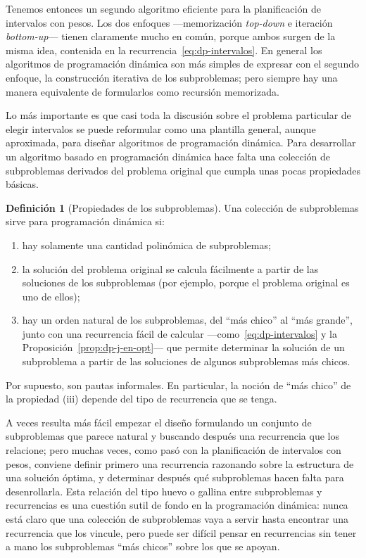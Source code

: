 \documentclass[12pt, spanish, oneside, openany]{book}
\theoremstyle{uprightplain}
\theoremstyle{definition}
\newtheorem{definicion}[teorema]{Definición}
\theoremstyle{remark}
\theoremstyle{definition}
\begin{document}
Tenemos entonces un segundo algoritmo eficiente para la planificación de intervalos con pesos. Los dos enfoques ---memorización \emph{top-down} e iteración \emph{bottom-up}--- tienen claramente mucho en común, porque ambos surgen de la misma idea, contenida en la recurrencia~\eqref{eq:dp-intervalos}. En general los algoritmos de programación dinámica son más simples de expresar con el segundo enfoque, la construcción iterativa de los subproblemas; pero siempre hay una manera equivalente de formularlos como recursión memorizada.

Lo más importante es que casi toda la discusión sobre el problema particular de elegir intervalos se puede reformular como una plantilla general, aunque aproximada, para diseñar algoritmos de programación dinámica. Para desarrollar un algoritmo basado en programación dinámica hace falta una colección de subproblemas derivados del problema original que cumpla unas pocas propiedades básicas.

\begin{definicion}[Propiedades de los subproblemas]
\label{def:dp-propiedades}
Una colección de subproblemas sirve para programación dinámica si:
\begin{enumerate}[label=(\roman*)]
    \item hay solamente una cantidad polinómica de subproblemas;
    \item la solución del problema original se calcula fácilmente a partir de las soluciones de los subproblemas (por ejemplo, porque el problema original es uno de ellos);
    \item hay un orden natural de los subproblemas, del ``más chico'' al ``más grande'', junto con una recurrencia fácil de calcular ---como~\eqref{eq:dp-intervalos} y la Proposición~\ref{prop:dp-j-en-opt}--- que permite determinar la solución de un subproblema a partir de las soluciones de algunos subproblemas más chicos.
\end{enumerate}
\end{definicion}

Por supuesto, son pautas informales. En particular, la noción de ``más chico'' de la propiedad (iii) depende del tipo de recurrencia que se tenga.

A veces resulta más fácil empezar el diseño formulando un conjunto de subproblemas que parece natural y buscando después una recurrencia que los relacione; pero muchas veces, como pasó con la planificación de intervalos con pesos, conviene definir primero una recurrencia razonando sobre la estructura de una solución óptima, y determinar después qué subproblemas hacen falta para desenrollarla. Esta relación del tipo huevo o gallina entre subproblemas y recurrencias es una cuestión sutil de fondo en la programación dinámica: nunca está claro que una colección de subproblemas vaya a servir hasta encontrar una recurrencia que los vincule, pero puede ser difícil pensar en recurrencias sin tener a mano los subproblemas ``más chicos'' sobre los que se apoyan.
\end{document}

